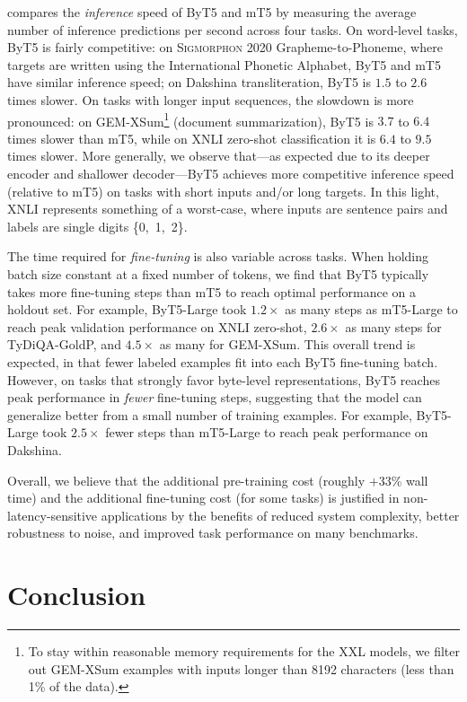 \documentclass[11pt,a4paper]{article}
\begin{document}
 compares the \textit{inference} speed of ByT5 and mT5 by measuring the average number of inference predictions per second across four tasks. On word-level tasks, ByT5 is fairly competitive: on \textsc{Sigmorphon} 2020 Grapheme-to-Phoneme, where targets are written using the International Phonetic Alphabet, ByT5 and mT5 have similar inference speed; on Dakshina transliteration, ByT5 is $1.5$ to $2.6$ times slower. On tasks with longer input sequences, the slowdown is more pronounced: on \mbox{GEM-XSum}\footnote{To stay within reasonable memory requirements for the XXL models, we filter out \mbox{GEM-XSum} examples with inputs longer than 8192 characters (less than 1\% of the data).} (document summarization), ByT5 is $3.7$ to $6.4$ times slower than mT5, while on XNLI zero-shot classification it is $6.4$ to $9.5$ times slower. More generally, we observe that---as expected due to its deeper encoder and shallower decoder---ByT5 achieves more competitive inference speed (relative to mT5) on tasks with short inputs and/or long targets. In this light, XNLI represents something of a worst-case, where inputs are sentence pairs and labels are single digits \{0,~1,~2\}.

The time required for \textit{fine-tuning} is also variable across tasks. When holding batch size constant at a fixed number of tokens, we find that ByT5 typically takes more fine-tuning steps than mT5 to reach optimal performance on a holdout set. For example, ByT5-Large took $1.2\times$ as many steps as mT5-Large to reach peak validation performance on XNLI zero-shot, $2.6\times$ as many steps for TyDiQA-GoldP, and $4.5\times$ as many for \mbox{GEM-XSum}. This overall trend is expected, in that fewer labeled examples fit into each ByT5 fine-tuning batch. However, on tasks that strongly favor byte-level representations, ByT5 reaches peak performance in \emph{fewer} fine-tuning steps, suggesting that the model can generalize better from a small number of training examples. For example, ByT5-Large took $2.5\times$ fewer steps than mT5-Large to reach peak performance on Dakshina.

Overall, we believe that the additional pre-training cost (roughly $+33$\% wall time) and the additional fine-tuning cost (for some tasks) is justified in non-latency-sensitive applications by the benefits of reduced system complexity, better robustness to noise, and improved task performance on many benchmarks.

\section{Conclusion}
\label{sec:conclusion}
\end{document}
